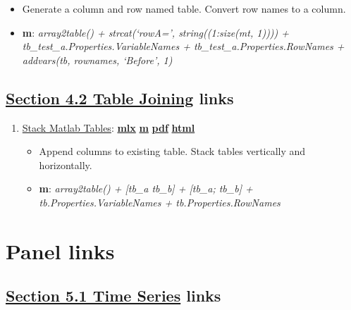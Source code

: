 \documentclass[
]{book}
\providecommand{\tightlist}{%
  \setlength{\itemsep}{0pt}\setlength{\parskip}{0pt}}
\begin{document}
\begin{enumerate}
  \begin{itemize}
  \tightlist
  \item
    Generate a column and row named table. Convert row names to a column.
  \item
    \textbf{m}: \emph{array2table() + strcat(`rowA=', string((1:size(mt, 1)))) + tb\_test\_a.Properties.VariableNames + tb\_test\_a.Properties.RowNames + addvars(tb, rownames, `Before', 1)}
  \end{itemize}
\end{enumerate}

\hypertarget{section-4.2-table-joiningtable-joining-links}{%
\subsection{\texorpdfstring{\protect\hyperlink{table-joining}{Section 4.2 Table Joining} links}{Section 4.2 Table Joining links}}\label{section-4.2-table-joiningtable-joining-links}}

\begin{enumerate}
\def\labelenumi{\arabic{enumi}.}
\tightlist
\item
  \href{https://fanwangecon.github.io/M4Econ/table/join/htmlpdfm/fs_tab_stack.html}{Stack Matlab Tables}: \href{https://github.com/FanWangEcon/M4Econ/blob/master/table/join/fs_tab_stack.mlx}{\textbf{mlx}} \textbar{} \href{https://github.com/FanWangEcon/M4Econ/blob/master/table/join/htmlpdfm/fs_tab_stack.m}{\textbf{m}} \textbar{} \href{https://github.com/FanWangEcon/M4Econ/blob/master/table/join/htmlpdfm/fs_tab_stack.pdf}{\textbf{pdf}} \textbar{} \href{https://fanwangecon.github.io/M4Econ/table/join/htmlpdfm/fs_tab_stack.html}{\textbf{html}}

  \begin{itemize}
  \tightlist
  \item
    Append columns to existing table. Stack tables vertically and horizontally.
  \item
    \textbf{m}: \emph{array2table() + {[}tb\_a tb\_b{]} + {[}tb\_a; tb\_b{]} + tb.Properties.VariableNames + tb.Properties.RowNames}
  \end{itemize}
\end{enumerate}

\hypertarget{panel-links}{%
\section{Panel links}\label{panel-links}}

\hypertarget{section-5.1-time-seriestime-series-links}{%
\subsection{\texorpdfstring{\protect\hyperlink{time-series}{Section 5.1 Time Series} links}{Section 5.1 Time Series links}}\label{section-5.1-time-seriestime-series-links}}
\end{document}
